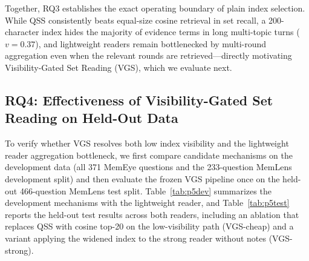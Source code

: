 \documentclass[10pt]{article}
\newcommand{\qss}{QSS}
\begin{document}
Together, RQ3 establishes the exact operating boundary of plain index selection. While \qss{} consistently beats equal-size cosine retrieval in set recall, a 200-character index hides the majority of evidence terms in long multi-topic turns ($v{=}0.37$), and lightweight readers remain bottlenecked by multi-round aggregation even when the relevant rounds are retrieved—directly motivating Visibility-Gated Set Reading (VGS), which we evaluate next.

\subsection{RQ4: Effectiveness of Visibility-Gated Set Reading on Held-Out Data}
\label{sec:rq4}

To verify whether VGS resolves both low index visibility and the lightweight reader aggregation bottleneck, we first compare candidate mechanisms on the development data (all 371 MemEye questions and the 233-question MemLens development split) and then evaluate the frozen VGS pipeline once on the held-out 466-question MemLens test split. Table~\ref{tab:p5dev} summarizes the development mechanisms with the lightweight reader, and Table~\ref{tab:p5test} reports the held-out test results across both readers, including an ablation that replaces \qss{} with cosine top-20 on the low-visibility path (VGS-cheap) and a variant applying the widened index to the strong reader without notes (VGS-strong).
\end{document}
